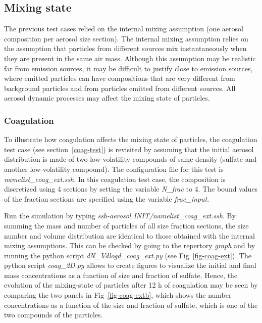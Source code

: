\documentclass[a4paper,11pt]{article}
\begin{document}
\subsection{Mixing state}
The previous test cases relied on the internal mixing assumption (one aerosol
composition per aerosol size section).
The internal mixing assumption relies on the assumption that particles from different sources
mix instantaneously when they are present in the same air mass. Although this assumption may
be realistic far from emission sources, it may be difficult to justify close to emission sources,
where emitted particles can have compositions that are very different from background particles
and from particles emitted from different sources.
All aerosol dynamic processes may affect the mixing state of particles.

\subsubsection{Coagulation}

To illustrate how coagulation affects the mixing state of particles, the
coagulation test case (see section~\ref{coag-test}) is revisited by assuming
that the initial aerosol distribution is made of two low-volatility compounds
of same density (sulfate and another low-volatility compound).
The configuration file for this test is {\it{namelist\_coag\_ext.ssh}}.
In this coagulation test case, the composition is discretized using 4 sections
by setting the variable {\it{N\_frac}} to 4. The bound values of the fraction
sections are specified using the variable {\it{frac\_input}}.

Run the simulation by typing {\it{ssh-aerosol INIT/namelist\_coag\_ext.ssh}}.
By summing the mass and number of particles of all size fraction sections, the
size number and volume distribution are identical to those obtained with the
internal mixing assumptions. This can be checked by going to the repertory
{\it{graph}} and by running the python script {\it{dN\_Vdlogd\_coag\_ext.py}}
(see Fig~\ref{fig-coag-ext}).
The python script {\it{coag\_2D.py}} allows to create figures to visualize the initial and final mass concentrations as a function of size and fraction of sulfate.
Hence, the evolution of the mixing-state of particles after 12 h of coagulation may
be seen by comparing the two panels in Fig~\ref{fig-coag-extb}, which shows
the number concentrations as a function of the size and fraction of 
sulfate, which is one of the
two compounds of the particles.
\end{document}
